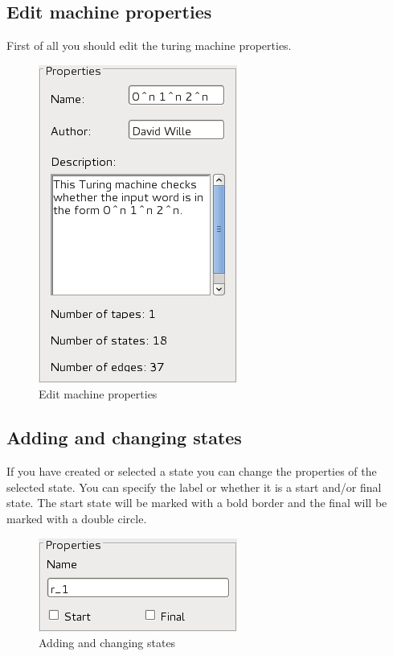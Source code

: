 \documentclass[%
  a4paper,%
  11pt,%
  blue,%
  hyperref	%
  ]{tubsartcl}
\begin{document}
\newpage

\subsection{Edit machine properties}
\label{sec:edit-mach-prop}
First of all you should edit the turing machine properties.
\begin{figure}[!htb]
\begin{center}
\includegraphics[scale=0.5]{graphics_gui/machine_properties.png}
\end{center}
\caption{Edit machine properties}
\label{pic:machine_properties}
\end{figure}

\newpage

\subsection{Adding and changing states}
\label{sec:add-edit-states}
If you have created or selected a state you can change the properties of the selected state. You can specify the label or whether it is a start and/or final state. The start state will be marked with a bold border and the final will be marked with a double circle.
\begin{figure}[!htb]
\begin{center}
\includegraphics[scale=0.5]{graphics_gui/state_properties.png}
\end{center}
\caption{Adding and changing states}
\label{pic:state_properties}
\end{figure}
\end{document}
